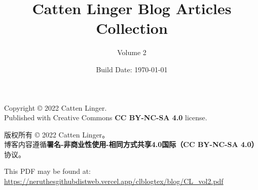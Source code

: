 \documentclass[11pt,a4paper]{report}
\title{Catten Linger Blog Articles Collection}
\author{Volume 2}
\date{Build Date: \today}
\begin{document}
\begin{titlepage}
	\maketitle
\end{titlepage}

\tableofcontents
\clearpage












\cleardoublepage
\pagestyle{empty}
\hspace{1pt}
\vfill
{}\small

Copyright \copyright{} 2022 Catten Linger.\\
Published with Creative Commons \textbf{CC BY-NC-SA 4.0} license.

版权所有 \copyright{} 2022 Catten Linger。\\
博客内容遵循\textbf{署名-非商业性使用-相同方式共享4.0国际（CC BY-NC-SA 4.0）}协议。

This PDF may be found at:\\
\href{https://neruthesgithubdistweb.vercel.app/clblogtex/blog/CL\_vol2.pdf}{\ttfamily\footnotesize https://neruthesgithubdistweb.vercel.app/clblogtex/blog/CL\_vol2.pdf}
\end{document}

